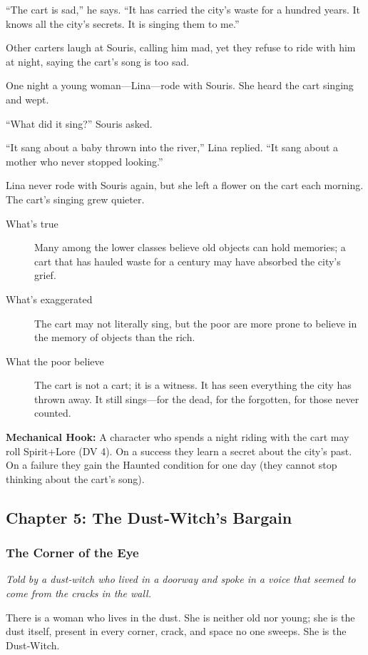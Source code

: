 \documentclass[11pt]{article}
\begin{document}
“The cart is sad,” he says. “It has carried the city’s waste for a hundred years. It knows all the city’s secrets. It is singing them to me.”

Other carters laugh at Souris, calling him mad, yet they refuse to ride with him at night, saying the cart’s song is too sad.

One night a young woman—Lina—rode with Souris. She heard the cart singing and wept.

“What did it sing?” Souris asked.

“It sang about a baby thrown into the river,” Lina replied. “It sang about a mother who never stopped looking.”

Lina never rode with Souris again, but she left a flower on the cart each morning. The cart’s singing grew quieter.

\begin{description}
\item[What's true] Many among the lower classes believe old objects can hold memories; a cart that has hauled waste for a century may have absorbed the city’s grief.
\item[What's exaggerated] The cart may not literally sing, but the poor are more prone to believe in the memory of objects than the rich.
\item[What the poor believe] The cart is not a cart; it is a witness. It has seen everything the city has thrown away. It still sings—for the dead, for the forgotten, for those never counted.
\end{description}

\textbf{Mechanical Hook:} A character who spends a night riding with the cart may roll Spirit+Lore (DV 4). On a success they learn a secret about the city’s past. On a failure they gain the Haunted condition for one day (they cannot stop thinking about the cart’s song).

\subsection{Chapter 5: The Dust‑Witch's Bargain}
\subsubsection{The Corner of the Eye}
\textit{Told by a dust‑witch who lived in a doorway and spoke in a voice that seemed to come from the cracks in the wall.}

There is a woman who lives in the dust. She is neither old nor young; she is the dust itself, present in every corner, crack, and space no one sweeps. She is the Dust‑Witch.
\end{document}
